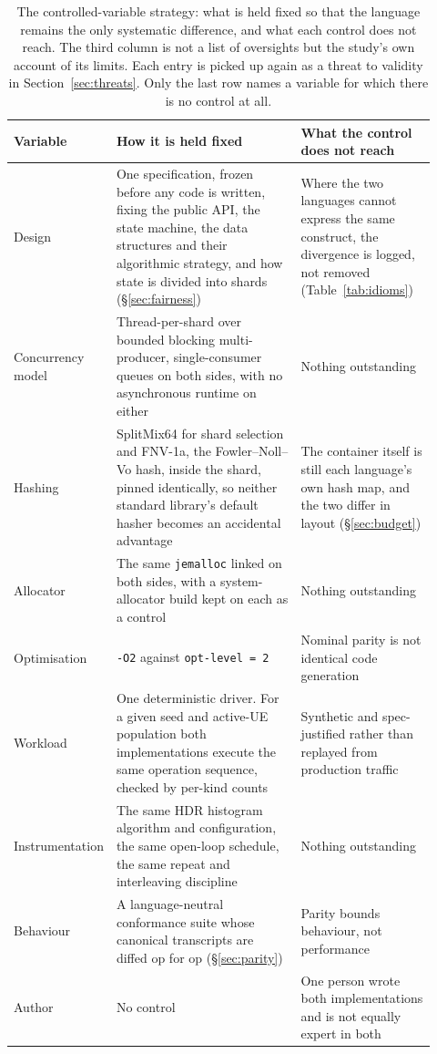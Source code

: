 \begin{table}[H]
\centering
\small
\caption[The controlled-variable strategy]{The controlled-variable strategy: what is held fixed so that the language remains the
only systematic difference, and what each control does not reach. The third column is not a
list of oversights but the study's own account of its limits. Each entry is picked up again as
a threat to validity in Section~\ref{sec:threats}. Only the last row names a variable for
which there is no control at all.\label{tab:controls}}
\footnotesize
\renewcommand{\arraystretch}{1.15}
\begin{tabular}{@{}R{0.16\linewidth} R{0.44\linewidth} R{0.32\linewidth}@{}}
\hline\hline
Variable & How it is held fixed & What the control does not reach \\
\hline
Design & One specification, frozen before any code is written, fixing the public API, the state machine, the data structures and their algorithmic strategy, and how state is divided into shards (\S\ref{sec:fairness}) & Where the two languages cannot express the same construct, the divergence is logged, not removed (Table~\ref{tab:idioms}) \\
Concurrency model & Thread-per-shard over bounded blocking multi-producer, single-consumer queues on both sides, with no asynchronous runtime on either & Nothing outstanding \\
Hashing & SplitMix64 for shard selection and FNV-1a, the Fowler--Noll--Vo hash, inside the shard, pinned identically, so neither standard library's default hasher becomes an accidental advantage & The container itself is still each language's own hash map, and the two differ in layout (\S\ref{sec:budget}) \\
Allocator & The same \texttt{jemalloc} linked on both sides, with a system-allocator build kept on each as a control & Nothing outstanding \\
Optimisation & \texttt{-O2} against \texttt{opt-level~=~2} & Nominal parity is not identical code generation \\
Workload & One deterministic driver. For a given seed and active-UE population both implementations execute the same operation sequence, checked by per-kind counts & Synthetic and spec-justified rather than replayed from production traffic \\
Instrumentation & The same HDR histogram algorithm and configuration, the same open-loop schedule, the same repeat and interleaving discipline & Nothing outstanding \\
Behaviour & A language-neutral conformance suite whose canonical transcripts are diffed op for op (\S\ref{sec:parity}) & Parity bounds behaviour, not performance \\
\hline
Author & No control & One person wrote both implementations and is not equally expert in both \\
\hline
\end{tabular}
\end{table}

